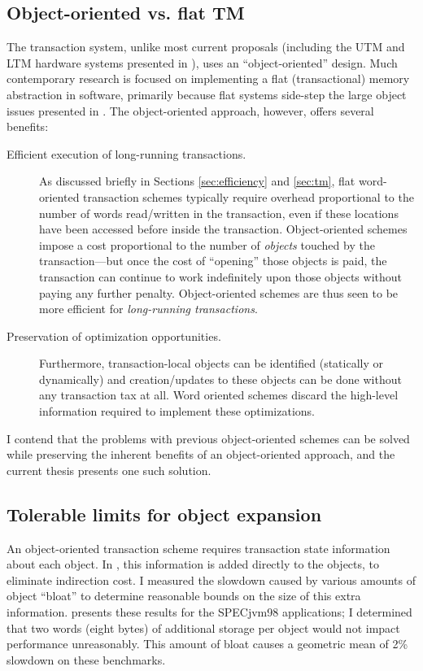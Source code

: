 \subsection{Object-oriented vs. flat TM}
The \apex transaction system, unlike most current proposals
\cite{HarrisFr03,HerlihyMo93} (including the
UTM and LTM hardware systems presented in ), uses an
``object-oriented'' design.  Much contemporary research is focused on
implementing a flat (transactional) memory abstraction in software,
primarily because flat systems side-step the large object issues
presented in .  The object-oriented approach, however, offers
several benefits:
\begin{description}
\item[Efficient execution of long-running transactions.]  As discussed
  briefly in Sections \ref{sec:efficiency} and \ref{sec:tm}, flat
  word-oriented transaction schemes typically require overhead proportional to
  the number of words read/written in the transaction, even if these
  locations have been accessed before inside the transaction. Object-oriented
  schemes impose a cost proportional to the number of \emph{objects}
  touched by the transaction---but once the cost of ``opening'' those
  objects is paid, the transaction can continue to work indefinitely
  upon those objects without paying any further penalty.
  Object-oriented schemes are thus seen to be more efficient for
  \emph{long-running transactions}.
\item[Preservation of optimization opportunities.]  Furthermore,
  transaction-local objects can be identified (statically or
  dynamically) and creation/updates to these objects can be done
  without any transaction tax at all.  Word oriented schemes discard
  the high-level information required to implement these optimizations.
\end{description}
I contend that the problems with previous object-oriented schemes can
be solved while preserving the inherent benefits of an object-oriented
approach, and the current thesis presents one such solution.

\subsection{Tolerable limits for object expansion}
An object-oriented transaction scheme requires transaction state
information about each object.  In \apex, this information is added
directly to the objects, to eliminate indirection cost.
I measured the slowdown caused by various
amounts of object ``bloat'' to determine reasonable bounds on the
size of this extra information.   presents these
results for the SPECjvm98 applications; I determined that two words
(eight bytes) of additional storage per object would not impact
performance unreasonably.  This amount of bloat causes a geometric
mean of 2\% slowdown on these benchmarks.

